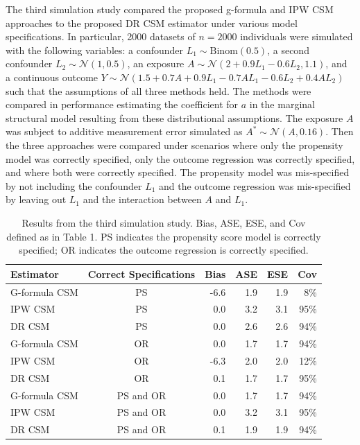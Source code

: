 \documentclass[useAMS,usenatbib,referee]{biom}
\begin{document}
The third simulation study compared the proposed g-formula and IPW CSM approaches to the proposed DR CSM estimator under various model specifications. In particular, 2000 datasets of $n = 2000$ individuals were simulated with the following variables: a confounder $L_{1} \sim \text{Binom}(0.5)$, a second confounder $L_{2} \sim \mathcal{N}(1, 0.5)$, an exposure $A \sim \mathcal{N}(2 + 0.9L_{1} - 0.6L_{2}, 1.1)$, and a continuous outcome $Y \sim \mathcal{N}(1.5 + 0.7A + 0.9L_{1} - 0.7AL_{1} - 0.6L_{2} + 0.4AL_{2})$ such that the assumptions of all three methods held. The methods were compared in performance estimating the coefficient for $a$ in the marginal structural model resulting from these distributional assumptions. The exposure $A$ was subject to additive measurement error simulated as $A^{*} \sim \mathcal{N}(A, 0.16)$. Then the three approaches were compared under scenarios where only the propensity model was correctly specified, only the outcome regression was correctly specified, and where both were correctly specified. The propensity model was mis-specified by not including the confounder $L_{1}$ and the outcome regression was mis-specified by leaving out $L_{1}$ and the interaction between $A$ and $L_{1}$.

\begin{table}[]
    \centering
    \caption{Results from the third simulation study. Bias, ASE, ESE, and Cov defined as in Table 1. PS indicates the propensity score model is correctly specified; OR indicates the outcome regression is correctly specified.}
    \begin{tabular}{lcrrrr}
    \hline
         Estimator & Correct Specifications & Bias & ASE & ESE & Cov \\
         \hline
G-formula CSM & PS & -6.6 & 1.9 & 1.9 & 8\% \\
IPW CSM & PS & 0.0 & 3.2 & 3.1 & 95\% \\
DR CSM & PS & 0.0 & 2.6 & 2.6 & 94\% \\[4pt]
G-formula CSM & OR & 0.0 & 1.7 & 1.7 & 94\% \\
IPW CSM & OR & -6.3 & 2.0 & 2.0 & 12\% \\
DR CSM & OR & 0.1 & 1.7 & 1.7 & 95\% \\[4pt]
G-formula CSM & PS and OR & 0.0 & 1.7 & 1.7 & 94\% \\
IPW CSM & PS and OR & 0.0 & 3.2 & 3.1 & 95\% \\
DR CSM & PS and OR & 0.1 & 1.9 & 1.9 & 94\% \\
         \hline
    \end{tabular}
    \label{tab:three}
\end{table}
\end{document}
